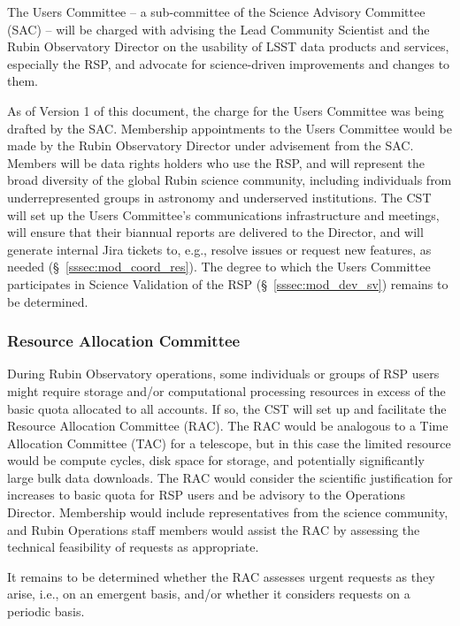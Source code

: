 \documentclass[DM,authoryear,toc]{lsstdoc}
\begin{document}
The Users Committee -- a sub-committee of the Science Advisory Committee (SAC) -- will be charged with advising the Lead Community Scientist and the Rubin Observatory Director on the usability of LSST data products and services, especially the RSP, and advocate for science-driven improvements and changes to them.

As of Version 1 of this document, the charge for the Users Committee was being drafted by the SAC.
Membership appointments to the Users Committee would be made by the Rubin Observatory Director under advisement from the SAC.
Members will be data rights holders who use the RSP, and will represent the broad diversity of the global Rubin science community, including individuals from underrepresented groups in astronomy and underserved institutions.
The CST will set up the Users Committee's communications infrastructure and meetings, will ensure that their biannual reports are delivered to the Director, and will generate internal Jira tickets to, e.g., resolve issues or request new features, as needed (\S~\ref{sssec:mod_coord_res}).
The degree to which the Users Committee participates in Science Validation of the RSP (\S~\ref{sssec:mod_dev_sv}) remains to be determined.


\subsubsection{Resource Allocation Committee}\label{sssec:mod_coord_rac}

During Rubin Observatory operations, some individuals or groups of RSP users might require storage and/or computational processing resources in excess of the basic quota allocated to all accounts.
If so, the CST will set up and facilitate the Resource Allocation Committee (RAC).
The RAC would be analogous to a Time Allocation Committee (TAC) for a telescope, but in this case the limited resource would be compute cycles, disk space for storage, and potentially significantly large bulk data downloads.
The RAC would consider the scientific justification for increases to basic quota for RSP users and be advisory to the Operations Director.
Membership would include representatives from the science community, and Rubin Operations staff members would assist the RAC by assessing the technical feasibility of requests as appropriate.

It remains to be determined whether the RAC assesses urgent requests as they arise, i.e., on an emergent basis, and/or whether it considers requests on a periodic basis.
\end{document}
